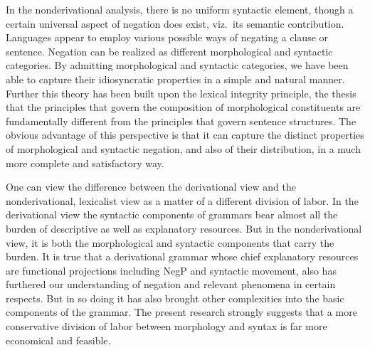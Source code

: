 \documentclass[output=paper]{langsci/langscibook}
\begin{document}
In the nonderivational analysis,  there is no uniform
syntactic element, though a certain universal aspect of
negation does exist, viz.\ its semantic contribution.
Languages appear to employ various possible
ways of negating a clause or sentence. Negation can
be realized as different morphological and syntactic categories.
By admitting morphological and syntactic categories,
we have been able to capture their idiosyncratic properties in a
simple and natural manner. Further this theory has been built upon
the lexical integrity principle, the thesis that the principles that govern the
composition
of morphological
constituents are fundamentally different from the principles that
govern sentence structures. The obvious advantage of
this perspective is that it can capture the distinct properties of
morphological and syntactic negation, and also of their distribution,
in a much more complete and satisfactory way.


One can view the difference between the derivational view
and the nonderivational, lexicalist view as a matter
of a different division of labor. In the derivational view
the syntactic components of grammars bear almost all the
burden of descriptive as well as explanatory resources.
But in the nonderivational view,  it is both the morphological
and syntactic components that carry the
burden.  It is true that a derivational
grammar whose chief explanatory resources are functional projections
including NegP and syntactic movement, also has
furthered our understanding of negation and
relevant phenomena in certain respects.
But in so doing it has also brought other complexities into the basic
components of the grammar. The present research strongly suggests
that a more conservative division of labor between morphology and syntax is
far more economical and feasible.


\fi
\printbibliography[heading=subbibliography,notkeyword=this] 
\end{document}
